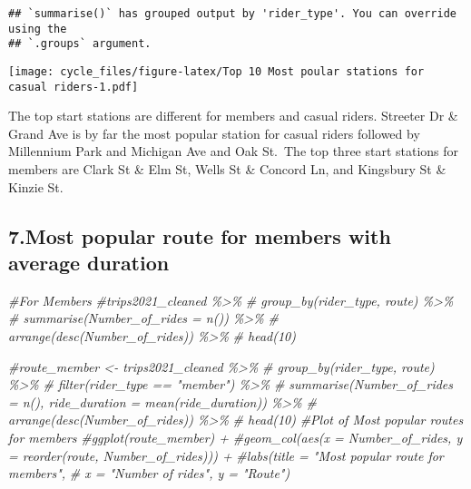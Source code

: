 \documentclass[
]{article}
\newenvironment{Shaded}{\begin{snugshade}}{\end{snugshade}}
\newcommand{\CommentTok}[1]{\textcolor[rgb]{0.56,0.35,0.01}{\textit{#1}}}
\begin{document}
\begin{verbatim}
## `summarise()` has grouped output by 'rider_type'. You can override using the
## `.groups` argument.
\end{verbatim}

\texttt{[image: cycle\_files/figure-latex/Top 10 Most poular stations for casual riders-1.pdf]}

The top start stations are different for members and casual riders.
Streeter Dr \& Grand Ave is by far the most popular station for casual
riders followed by Millennium Park and Michigan Ave and Oak St.~The top
three start stations for members are Clark St \& Elm St, Wells St \&
Concord Ln, and Kingsbury St \& Kinzie St.

\hypertarget{most-popular-route-for-members-with-average-duration}{%
\subsection{7.Most popular route for members with average
duration}\label{most-popular-route-for-members-with-average-duration}}

\begin{Shaded}
\begin{Highlighting}[]
\CommentTok{\#For Members}
\CommentTok{\#trips2021\_cleaned \%\textgreater{}\% }
 \CommentTok{\# group\_by(rider\_type, route) \%\textgreater{}\% }
 \CommentTok{\# summarise(Number\_of\_rides = n()) \%\textgreater{}\% }
 \CommentTok{\# arrange(desc(Number\_of\_rides)) \%\textgreater{}\% }
 \CommentTok{\# head(10)}

\CommentTok{\#route\_member \textless{}{-} trips2021\_cleaned \%\textgreater{}\% }
 \CommentTok{\# group\_by(rider\_type, route) \%\textgreater{}\% }
 \CommentTok{\# filter(rider\_type == "member") \%\textgreater{}\% }
 \CommentTok{\# summarise(Number\_of\_rides = n(), ride\_duration = mean(ride\_duration)) \%\textgreater{}\% }
 \CommentTok{\# arrange(desc(Number\_of\_rides)) \%\textgreater{}\% }
 \CommentTok{\# head(10)}
  \CommentTok{\#Plot of Most popular routes for members}
\CommentTok{\#ggplot(route\_member) + }
 \CommentTok{\#geom\_col(aes(x = Number\_of\_rides, y = reorder(route, Number\_of\_rides))) +}
  \CommentTok{\#labs(title = "Most popular route for members",}
    \CommentTok{\#  x = "Number of rides", y = "Route")}
\end{Highlighting}
\end{Shaded}
\end{document}
